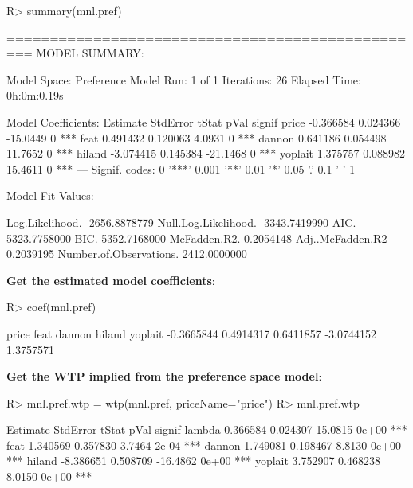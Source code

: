\documentclass[article]{jss}
\begin{document}
\begin{CodeChunk}

\begin{CodeInput}
R> summary(mnl.pref)
\end{CodeInput}

\begin{CodeOutput}
=================================================
MODEL SUMMARY: 
                         
Model Space:   Preference
Model Run:         1 of 1
Iterations:            26
Elapsed Time: 0h:0m:0.19s

Model Coefficients: 
         Estimate StdError    tStat pVal signif
price   -0.366584 0.024366 -15.0449    0    ***
feat     0.491432 0.120063   4.0931    0    ***
dannon   0.641186 0.054498  11.7652    0    ***
hiland  -3.074415 0.145384 -21.1468    0    ***
yoplait  1.375757 0.088982  15.4611    0    ***
---
Signif. codes:  0 '***' 0.001 '**' 0.01 '*' 0.05 '.' 0.1 ' ' 1

Model Fit Values: 
                                     
Log.Likelihood.         -2656.8878779
Null.Log.Likelihood.    -3343.7419990
AIC.                     5323.7758000
BIC.                     5352.7168000
McFadden.R2.                0.2054148
Adj..McFadden.R2            0.2039195
Number.of.Observations.  2412.0000000
\end{CodeOutput}
\end{CodeChunk}

\textbf{Get the estimated model coefficients}:

\begin{CodeChunk}

\begin{CodeInput}
R> coef(mnl.pref)
\end{CodeInput}

\begin{CodeOutput}
     price       feat     dannon     hiland    yoplait 
-0.3665844  0.4914317  0.6411857 -3.0744152  1.3757571 
\end{CodeOutput}
\end{CodeChunk}

\textbf{Get the WTP implied from the preference space model}:

\begin{CodeChunk}

\begin{CodeInput}
R> mnl.pref.wtp = wtp(mnl.pref, priceName="price")
R> mnl.pref.wtp
\end{CodeInput}

\begin{CodeOutput}
         Estimate StdError    tStat  pVal signif
lambda   0.366584 0.024307  15.0815 0e+00    ***
feat     1.340569 0.357830   3.7464 2e-04    ***
dannon   1.749081 0.198467   8.8130 0e+00    ***
hiland  -8.386651 0.508709 -16.4862 0e+00    ***
yoplait  3.752907 0.468238   8.0150 0e+00    ***
\end{CodeOutput}
\end{CodeChunk}
\end{document}
